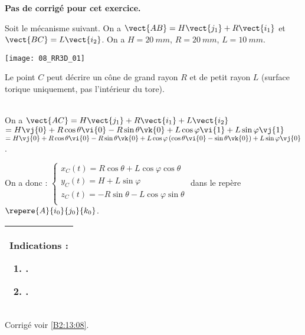 \normalfalse \difficiletrue \tdifficilefalse
\correctiontrue


\setcounter{numques}{0}
\ifcorrection
\else
\textbf{Pas de corrigé pour cet exercice.}
\fi

\ifprof
\else
Soit le mécanisme suivant. On a $\vect{AB}=H\vect{j_1}+R\vect{i_1}$ et $\vect{BC}=L\vect{i_2}$. On a $H=\SI{20}{mm}$, $R=\SI{20}{mm}$, $L=\SI{10}{mm}$. 
\begin{center}
\texttt{[image: 08\_RR3D\_01]}
\end{center}
\fi

\ifprof
Le point $C$ peut décrire un cône de grand rayon $R$ et de petit rayon $L$ (surface torique uniquement, pas l'intérieur du tore). 
\else
\fi

\ifprof ~\\
On  a  $\vect{AC}=H\vect{j_1}+R\vect{i_1}+L\vect{i_2}$ $=H\vj{0}+R\cos\theta\vi{0}-R\sin\theta\vk{0}+L\cos\varphi\vi{1}+L\sin\varphi\vj{1}$ 
$=H\vj{0}+R\cos\theta\vi{0}-R\sin\theta\vk{0}+L\cos\varphi\left(\cos\theta\vi{0}-\sin\theta\vk{0} \right)+L\sin\varphi\vj{0}$ .

On a donc :
$\left\{
\begin{array}{l}
x_C(t)=R\cos\theta+L\cos\varphi\cos\theta \\
y_C(t)= H+L\sin\varphi\\
z_C(t)=  -R\sin\theta-L\cos\varphi\sin\theta\\
\end{array}
\right.
$ dans le repère $\repere{A}{i_0}{j_0}{k_0}$.
\else
\fi

\ifprof
\else
\footnotesize
\begin{center}
\begin{tabular}{|p{.9\linewidth}|}
\hline
Indications :
\begin{enumerate}
\item .
\item .
\end{enumerate} \\ \hline
\end{tabular}
\end{center}
\normalsize
\begin{flushright}
\footnotesize{Corrigé  voir \ref{B2:13:08}.}
\end{flushright}%
\fi